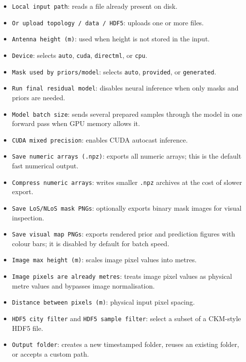 \begin{itemize}
\setlength\itemsep{0.15em}
  \item \texttt{Local input path}: reads a file already present on disk.
  \item \texttt{Or upload topology / data / HDF5}: uploads one or more files.
  \item \texttt{Antenna height (m)}: used when height is not stored in the input.
  \item \texttt{Device}: selects \texttt{auto}, \texttt{cuda},
        \texttt{directml}, or \texttt{cpu}.
  \item \texttt{Mask used by priors/model}: selects \texttt{auto},
        \texttt{provided}, or \texttt{generated}.
  \item \texttt{Run final residual model}: disables neural inference when only
        masks and priors are needed.
  \item \texttt{Model batch size}: sends several prepared samples through the
        model in one forward pass when GPU memory allows it.
  \item \texttt{CUDA mixed precision}: enables CUDA autocast inference.
  \item \texttt{Save numeric arrays (.npz)}: exports all numeric arrays; this
        is the default fast numerical output.
  \item \texttt{Compress numeric arrays}: writes smaller \texttt{.npz}
        archives at the cost of slower export.
  \item \texttt{Save LoS/NLoS mask PNGs}: optionally exports binary mask
        images for visual inspection.
  \item \texttt{Save visual map PNGs}: exports rendered prior and prediction
        figures with colour bars; it is disabled by default for batch speed.
  \item \texttt{Image max height (m)}: scales image pixel values into metres.
  \item \texttt{Image pixels are already metres}: treats image pixel values as
        physical metre values and bypasses image normalisation.
  \item \texttt{Distance between pixels (m)}: physical input pixel spacing.
  \item \texttt{HDF5 city filter} and \texttt{HDF5 sample filter}: select a
        subset of a CKM-style HDF5 file.
  \item \texttt{Output folder}: creates a new timestamped folder, reuses an
        existing folder, or accepts a custom path.
\end{itemize}


